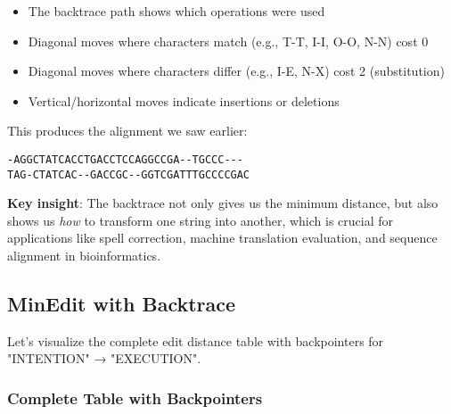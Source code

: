 \documentclass[11pt,a4paper]{article}
\theoremstyle{definition}
\theoremstyle{plain}
\theoremstyle{remark}
\begin{document}
\begin{itemize}
    \item The backtrace path shows which operations were used
    \item Diagonal moves where characters match (e.g., T-T, I-I, O-O, N-N) cost 0
    \item Diagonal moves where characters differ (e.g., I-E, N-X) cost 2 (substitution)
    \item Vertical/horizontal moves indicate insertions or deletions
\end{itemize}

This produces the alignment we saw earlier:
\begin{verbatim}
-AGGCTATCACCTGACCTCCAGGCCGA--TGCCC---
TAG-CTATCAC--GACCGC--GGTCGATTTGCCCCGAC
\end{verbatim}

\textbf{Key insight}: The backtrace not only gives us the minimum distance, but also shows us \textit{how} to transform one string into another, which is crucial for applications like spell correction, machine translation evaluation, and sequence alignment in bioinformatics.

\subsection{MinEdit with Backtrace}

Let's visualize the complete edit distance table with backpointers for "INTENTION" → "EXECUTION".

\subsubsection{Complete Table with Backpointers}
\end{document}
